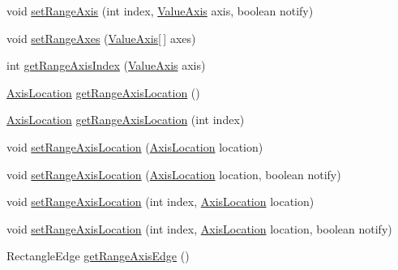\begin{DoxyCompactItemize}
void \mbox{\hyperlink{classorg_1_1jfree_1_1chart_1_1plot_1_1_category_plot_a83f3f8e8964cb743b06c00c88904e2fc}{set\+Range\+Axis}} (int index, \mbox{\hyperlink{classorg_1_1jfree_1_1chart_1_1axis_1_1_value_axis}{Value\+Axis}} axis, boolean notify)
\item 
void \mbox{\hyperlink{classorg_1_1jfree_1_1chart_1_1plot_1_1_category_plot_a88e20554a1e8626f073f1c2dd843c8f8}{set\+Range\+Axes}} (\mbox{\hyperlink{classorg_1_1jfree_1_1chart_1_1axis_1_1_value_axis}{Value\+Axis}}\mbox{[}$\,$\mbox{]} axes)
\item 
int \mbox{\hyperlink{classorg_1_1jfree_1_1chart_1_1plot_1_1_category_plot_aeaf9ec4110c7ecfb4bdddddf232e9bba}{get\+Range\+Axis\+Index}} (\mbox{\hyperlink{classorg_1_1jfree_1_1chart_1_1axis_1_1_value_axis}{Value\+Axis}} axis)
\item 
\mbox{\hyperlink{classorg_1_1jfree_1_1chart_1_1axis_1_1_axis_location}{Axis\+Location}} \mbox{\hyperlink{classorg_1_1jfree_1_1chart_1_1plot_1_1_category_plot_ae66bc6fd3a43e9a1de43d845ecc4f919}{get\+Range\+Axis\+Location}} ()
\item 
\mbox{\hyperlink{classorg_1_1jfree_1_1chart_1_1axis_1_1_axis_location}{Axis\+Location}} \mbox{\hyperlink{classorg_1_1jfree_1_1chart_1_1plot_1_1_category_plot_a1f8ff2c95bc3306523a6713d0e1f6e67}{get\+Range\+Axis\+Location}} (int index)
\item 
void \mbox{\hyperlink{classorg_1_1jfree_1_1chart_1_1plot_1_1_category_plot_a5fe01029746274b759dab2ce82d6670c}{set\+Range\+Axis\+Location}} (\mbox{\hyperlink{classorg_1_1jfree_1_1chart_1_1axis_1_1_axis_location}{Axis\+Location}} location)
\item 
void \mbox{\hyperlink{classorg_1_1jfree_1_1chart_1_1plot_1_1_category_plot_a67286c879b5155d03b131b20336a7307}{set\+Range\+Axis\+Location}} (\mbox{\hyperlink{classorg_1_1jfree_1_1chart_1_1axis_1_1_axis_location}{Axis\+Location}} location, boolean notify)
\item 
void \mbox{\hyperlink{classorg_1_1jfree_1_1chart_1_1plot_1_1_category_plot_a242adbc02f7e5b651062dbddfcfd9765}{set\+Range\+Axis\+Location}} (int index, \mbox{\hyperlink{classorg_1_1jfree_1_1chart_1_1axis_1_1_axis_location}{Axis\+Location}} location)
\item 
void \mbox{\hyperlink{classorg_1_1jfree_1_1chart_1_1plot_1_1_category_plot_ae55c6de25a0b27f3bbb05d8dd3391bbc}{set\+Range\+Axis\+Location}} (int index, \mbox{\hyperlink{classorg_1_1jfree_1_1chart_1_1axis_1_1_axis_location}{Axis\+Location}} location, boolean notify)
\item 
Rectangle\+Edge \mbox{\hyperlink{classorg_1_1jfree_1_1chart_1_1plot_1_1_category_plot_a9da77d0ad66568bb8e049d8a2f88d09e}{get\+Range\+Axis\+Edge}} ()

\end{DoxyCompactItemize}
